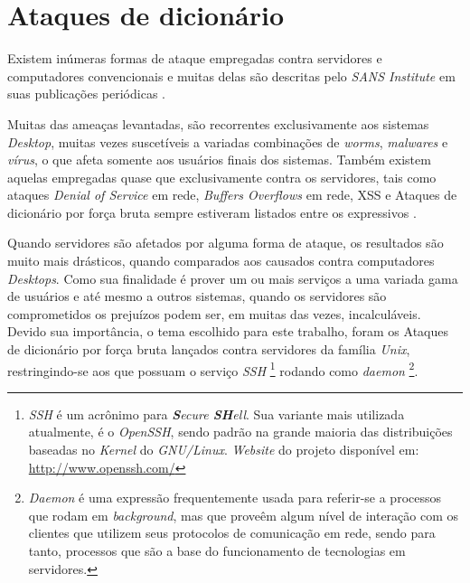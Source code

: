 \chapter{Ataques de dicionário}\label{1_ataques_servidores}

Existem inúmeras formas de ataque empregadas contra servidores e computadores convencionais e muitas delas são descritas pelo \textit{SANS Institute} em suas publicações periódicas \cite{Top20Sans}.

Muitas das ameaças levantadas, são recorrentes exclusivamente aos sistemas \textit{Desktop}, muitas vezes suscetíveis a variadas combinações de \textit{worms}, \textit{malwares} e \textit{vírus}, o que afeta somente aos usuários finais dos sistemas. Também existem aquelas empregadas quase que exclusivamente contra os servidores, tais como ataques \textit{Denial of Service} em rede, \textit{Buffers Overflows} em rede, XSS e Ataques de dicionário por força bruta sempre estiveram listados entre os expressivos \cite{Top10Sans} \cite{Top20Sans}.

Quando servidores são afetados por alguma forma de ataque, os resultados são muito mais drásticos, quando comparados aos causados contra computadores \textit{Desktops}. Como sua finalidade é prover um ou mais serviços a uma variada gama de usuários e até mesmo a outros sistemas, quando os servidores são comprometidos os prejuízos podem ser, em muitas das vezes, incalculáveis. Devido sua importância, o tema escolhido para este trabalho, foram os Ataques de dicionário por força bruta lançados contra servidores da família \textit{Unix}, restringindo-se aos que possuam o serviço \textit{SSH} \footnote{\textit{SSH} é um acrônimo para \textit{\textbf{S}ecure \textbf{SH}ell}. Sua variante mais utilizada atualmente, é o \textit{OpenSSH}, sendo padrão na grande maioria das distribuições baseadas no \textit{Kernel} do \textit{GNU/Linux}. \textit{Website} do projeto disponível em: \url{http://www.openssh.com/}} rodando como \textit{daemon} \footnote{\textit{Daemon} é uma expressão frequentemente usada para referir-se a processos que rodam em \textit{background}, mas que proveêm algum nível de interação com os clientes que utilizem seus protocolos de comunicação em rede, sendo para tanto, processos que são a base do funcionamento de tecnologias em servidores.}.

